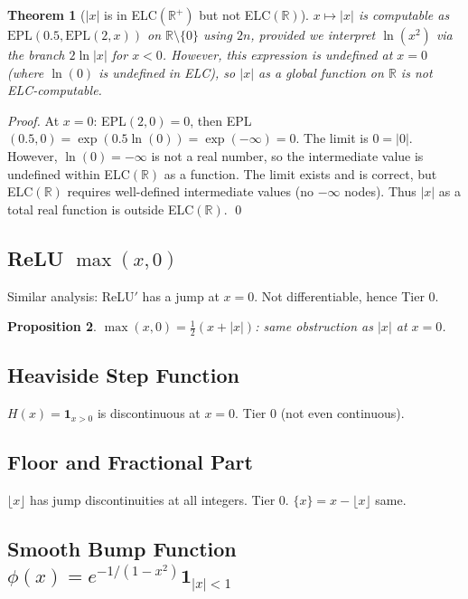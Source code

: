 \documentclass[11pt]{article}
\newtheorem{theorem}{Theorem}
\newtheorem{proposition}[theorem]{Proposition}
\begin{document}
\begin{theorem}[$|x|$ is in ELC$(\mathbb{R}^+)$ but not ELC$(\mathbb{R})$]
\label{thm:abs}
$x\mapsto|x|$ is computable as $\mathrm{EPL}(0.5,\mathrm{EPL}(2,x))$ on $\mathbb{R}\setminus\{0\}$
using $2n$, provided we interpret $\ln(x^2)$ via the branch $2\ln|x|$ for $x<0$.
However, this expression is undefined at $x=0$ (where $\ln(0)$ is undefined in ELC),
so $|x|$ as a global function on $\mathbb{R}$ is not ELC-computable.
\end{theorem}

\begin{proof}
At $x=0$: EPL$(2,0)=0$, then EPL$(0.5,0)=\exp(0.5\ln(0))=\exp(-\infty)=0$. The limit is $0=|0|$.
However, $\ln(0)=-\infty$ is not a real number, so the intermediate value is undefined
within ELC$(\mathbb{R})$ as a function. The limit exists and is correct, but ELC$(\mathbb{R})$
requires well-defined intermediate values (no $-\infty$ nodes). Thus $|x|$ as a total
real function is outside ELC$(\mathbb{R})$. \qed
\end{proof}

\subsection{ReLU $\max(x,0)$}

Similar analysis: ReLU$'$ has a jump at $x=0$. Not differentiable, hence Tier 0.

\begin{proposition}
$\max(x,0)=\tfrac12(x+|x|)$: same obstruction as $|x|$ at $x=0$.
\end{proposition}

\subsection{Heaviside Step Function}

$H(x)=\mathbf{1}_{x>0}$ is discontinuous at $x=0$. Tier 0 (not even continuous).

\subsection{Floor and Fractional Part}

$\lfloor x\rfloor$ has jump discontinuities at all integers. Tier 0.
$\{x\}=x-\lfloor x\rfloor$ same.

\subsection{Smooth Bump Function $\phi(x)=e^{-1/(1-x^2)}\mathbf{1}_{|x|<1}$}
\end{document}
